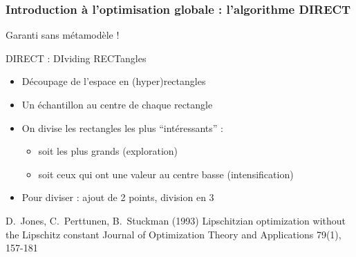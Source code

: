 \documentclass{beamer}
\begin{document}
\begin{frame}
  \frametitle{Introduction à l'optimisation globale : l'algorithme DIRECT}
  Garanti sans métamodèle !
  \begin{block}{DIRECT : DIviding RECTangles}
  \begin{itemize}
   \item Découpage de l'espace en (hyper)rectangles
   \item Un échantillon au centre de chaque rectangle
   \item On divise les rectangles les plus ``intéressants'' :
   \begin{itemize}
     \item soit les plus grands (exploration)
     \item soit ceux qui ont une valeur au centre basse (intensification)
   \end{itemize}
   \item Pour diviser : ajout de 2 points, division en 3
  \end{itemize}
  \end{block}
  \scriptsize{
 \begin{thebibliography}{7}
\beamertemplatearticlebibitems
     D.~Jones, C.~Perttunen, B.~Stuckman (1993)
         \newblock Lipschitzian optimization without the Lipschitz constant
         \newblock Journal of Optimization Theory and Applications 79(1), 157-181
 \end{thebibliography}
}
\normalsize
%   
\end{frame}
\end{document}
